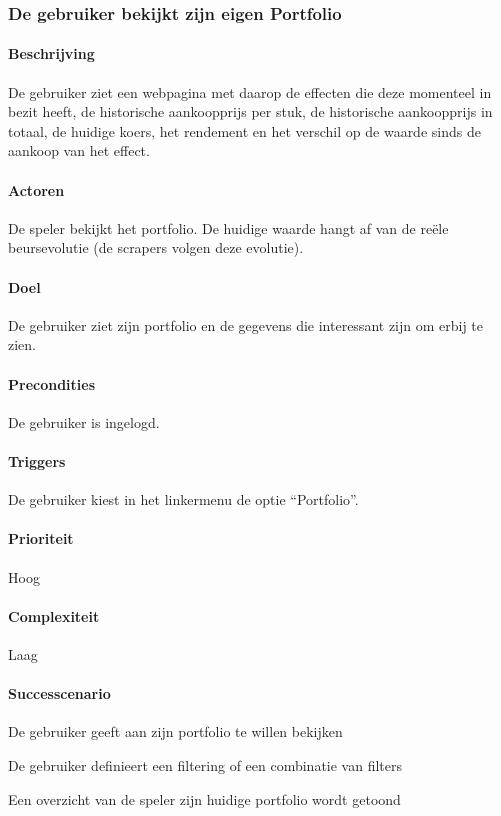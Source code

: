 \subsubsection{De gebruiker bekijkt zijn eigen Portfolio}
\begin{compact}
\paragraph{Beschrijving} De gebruiker ziet een webpagina met daarop de effecten die deze momenteel in bezit heeft, de historische aankoopprijs per stuk, de historische aankoopprijs in totaal, de huidige koers, het rendement en het verschil op de waarde sinds de aankoop van het effect.
\paragraph{Actoren} De speler bekijkt het portfolio. De huidige waarde hangt af van de re\"ele beursevolutie (de scrapers volgen deze evolutie).
\paragraph{Doel} De gebruiker ziet zijn portfolio en de gegevens die interessant zijn om erbij te zien.
\paragraph{Precondities} De gebruiker is ingelogd.
\paragraph{Triggers} De gebruiker kiest in het linkermenu de optie ``Portfolio''.
\paragraph{Prioriteit}Hoog
\paragraph{Complexiteit}Laag
\paragraph{Successcenario}
\begin{enumerate_compact}
 \item De gebruiker geeft aan zijn portfolio te willen bekijken
 \item De gebruiker definieert een filtering of een combinatie van filters
 \item Een overzicht van de speler zijn huidige portfolio wordt getoond
\end{enumerate_compact}
\end{compact}

